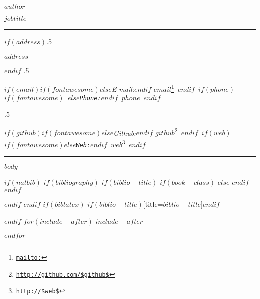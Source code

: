 \documentclass[$if(fontsize)$$fontsize$,$endif$$if(lang)$$babel-lang$,$endif$$if(papersize)$$papersize$paper,$endif$$for(classoption)$$classoption$$sep$,$endfor$]{$documentclass$}
\renewcommand{\href}[2]{#2\footnote{\url{#1}}}
\begin{document}
              
              
              \centerline{\huge \bf $author$}
              
              \vspace{2 mm}
              
              \centerline{\normalsize $jobtitle$}
              
              \vspace{2 mm}
              
              \hrule
              
              \vspace{2 mm}
              
              $if(address)$\moveleft.5\hoffset\centerline{$address$}$endif$
                \moveleft.5\hoffset\centerline{ 
              $if(email)$$if(fontawesome)$\faEnvelopeO \hspace{1 mm}$else$\emph{E-mail:}$endif$ \href{mailto:}{\tt $email$} \hspace{1 mm}$endif$ 
                $if(phone)$$if(fontawesome)$ \faPhone \hspace{1 mm}$else$\emph{Phone:}$endif$  $phone$  \hspace{1 mm} $endif$}
                \moveleft.5\hoffset\centerline{ 
                $if(github)$$if(fontawesome)$\faGithub \hspace{1 mm}$else$\emph{Github:}$endif$ \href{http://github.com/$github$}{\tt $github$} \hspace{1 mm} $endif$   
                $if(web)$$if(fontawesome)$\faGlobe \hspace{1 mm}$else$\emph{Web:}$endif$ \href{http://$web$}{\tt $web$}  $endif$ 
                }
              
              \vspace{2 mm}
              
              \hrule
              
              
              $body$
                
                $if(natbib)$
                $if(bibliography)$
                $if(biblio-title)$
                $if(book-class)$
                \renewcommand\bibname{$biblio-title$}
              $else$
                \renewcommand\refname{$biblio-title$}
              $endif$
                $endif$
                
              
              $endif$
                $endif$
                $if(biblatex)$
                \printbibliography$if(biblio-title)$[title=$biblio-title$]$endif$
                
                $endif$
                $for(include-after)$
                $include-after$
                
                $endfor$
                
\end{document}

